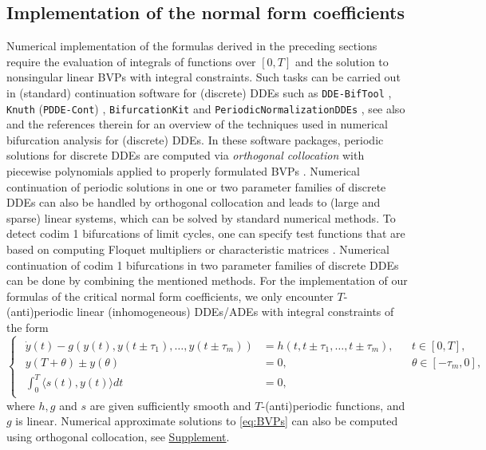\documentclass[english]{myarticle}
\begin{document}
\begin{sloppypar}
\subsection{Implementation of the normal form coefficients} \label{subsec:implementationnormalforms}
Numerical implementation of the formulas derived in the preceding sections require the evaluation of integrals of functions over $[0,T]$ and the solution to nonsingular linear BVPs with integral constraints. Such tasks can be carried out in (standard) continuation software for (discrete) DDEs such as \verb|DDE-BifTool| \cite{Engelborghs2002,Sieber2014}, \verb|Knuth| (\verb|PDDE-Cont|) \cite{Szalai2013}, \verb|BifurcationKit| \cite{Veltz2020} and \verb|PeriodicNormalizationDDEs| \cite{Bosschaert2024c}, see also \cite{Roose2007,Krauskopf2022} and the references therein for an overview of the techniques used in numerical bifurcation analysis for (discrete) DDEs. In these software packages, periodic solutions for discrete DDEs are computed via \emph{orthogonal collocation} with piecewise polynomials applied to properly formulated BVPs \cite{Engelborghs2001,Engelborghs2002a}. Numerical continuation of periodic solutions in one or two parameter families of discrete DDEs can also be handled by orthogonal collocation and leads to (large and sparse) linear systems, which can be solved by standard numerical methods. To detect codim 1 bifurcations of limit cycles, one can specify test functions that are based on computing Floquet multipliers \cite{Luzyanina2002,Breda2022a} or characteristic matrices \cite{Sieber2011,Szalai2006}. Numerical continuation of codim 1 bifurcations in two parameter families of discrete DDEs can be done by combining the mentioned methods. For the implementation of our formulas of the critical normal form coefficients, we only encounter $T$-(anti)periodic linear (inhomogeneous) DDEs/ADEs with integral constraints of the form
\begin{equation} \label{eq:BVPs} \tag{BVP}
    \begin{cases}
    \begin{aligned}
        \dot{y}(t) - g(y(t),y(t \pm \tau_1),\dots,y(t \pm \tau_m)) &= h(t,t \pm \tau_1,\dots,t \pm \tau_m), &&t \in [0,T], \\
        y(T + \theta) \pm y(\theta) &= 0, &&\theta \in [-\tau_m,0], \\
        \textstyle\int_0^T \langle s(t), y(t) \rangle dt  &= 0,
    \end{aligned}
    \end{cases}
\end{equation}
where $h,g$ and $s$ are given sufficiently smooth and $T$-(anti)periodic functions, and $g$ is linear. Numerical approximate solutions to \eqref{eq:BVPs} can also be computed using orthogonal collocation, see \hyperlink{mysupplement}{Supplement}.


\end{sloppypar}
\end{document}
